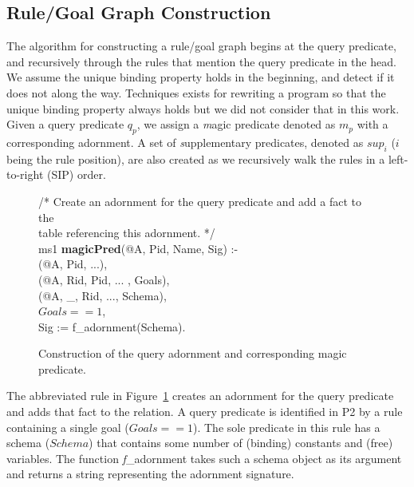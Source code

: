 \subsection{Rule/Goal Graph Construction}
\label{ch:magic:sec:rgconstruct}

The algorithm for constructing a rule/goal graph begins at the query
predicate, and recursively through the rules that mention the query predicate
in the head.  We assume the unique binding property holds in the beginning, and
detect if it does not along the way.  Techniques exists for rewriting a program
so that the unique binding property always holds but we did not consider that
in this work.  Given a query predicate $q_p$, we assign a {\emph magic predicate}
denoted as $m_p$ with a corresponding adornment.  A set of {\emph supplementary
predicates}, denoted as $sup_i$ ($i$ being the rule position), are also created as
we recursively walk the rules in a left-to-right (SIP) order.


\begin{figure}[!t]
\ssp
\centering
\begin{boxedminipage}{\linewidth}

/* Create an adornment for the query predicate and add a fact to the \\
 table referencing this adornment. */ \\
ms1 {\bf magicPred}(@A, Pid, Name, Sig) :- \\
(@A, Pid, ...), \\
(@A, Rid, Pid, ... , Goals), \\
(@A, \_, Rid, ..., Schema), \\
\datalogspace $Goals == 1$, \\
\datalogspace Sig := f\_adornment(Schema).
	
\end{boxedminipage}
\caption{\label{ch:magic:fig:magic1}Construction of the query adornment and corresponding magic predicate.}
\end{figure}

The abbreviated rule in Figure~\ref{ch:magic:fig:magic1} creates an adornment
for the query predicate and adds that fact to the  relation.  A
query predicate is identified in P2 by a rule containing a single goal ($Goals
== 1$).  The sole predicate in this rule has a schema ($Schema$) that contains
some number of (binding) constants and (free) variables.  The function {\emph
f\_adornment} takes such a schema object as its argument and returns a string
representing the adornment signature.

